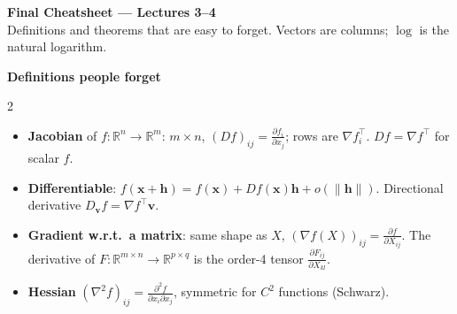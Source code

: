 \documentclass[10pt]{article}
\newcommand{\norm}[1]{\lVert #1 \rVert}
\newcommand{\topic}[1]{\par\smallskip\noindent{\color{blue!50!black}\textbf{#1}}\par}
\newcommand{\head}[1]{\begin{center}\colorbox{blue!10}{\parbox{0.96\linewidth}{\centering\textbf{#1}}}\end{center}}
\begin{document}
\footnotesize

\begin{center}
    {\large\textbf{Final Cheatsheet --- Lectures 3--4}}\\
    Definitions and theorems that are easy to forget. Vectors are columns; $\log$ is the natural logarithm.
\end{center}

\head{Definitions people forget}

\raggedcolumns
\begin{multicols}{2}

\topic{Derivatives}
\begin{itemize}
    \item \textbf{Jacobian} of $f: \mathbb{R}^n \to \mathbb{R}^m$: $m \times n$, $(Df)_{ij} = \frac{\partial f_i}{\partial x_j}$; rows are $\nabla f_i^\top$. $Df = \nabla f^\top$ for scalar $f$.
    \item \textbf{Differentiable}: $f(\mathbf{x} + \mathbf{h}) = f(\mathbf{x}) + Df(\mathbf{x})\mathbf{h} + o(\norm{\mathbf{h}})$. Directional derivative $D_{\mathbf{v}}f = \nabla f^\top\mathbf{v}$.
    \item \textbf{Gradient w.r.t.\ a matrix}: same shape as $X$, $(\nabla f(X))_{ij} = \frac{\partial f}{\partial X_{ij}}$. The derivative of $F: \mathbb{R}^{m \times n} \to \mathbb{R}^{p \times q}$ is the order-4 tensor $\frac{\partial F_{ij}}{\partial X_{kl}}$.
    \item \textbf{Hessian} $(\nabla^2 f)_{ij} = \frac{\partial^2 f}{\partial x_i\partial x_j}$, symmetric for $C^2$ functions (Schwarz).
\end{itemize}


\end{multicols}
\end{document}

